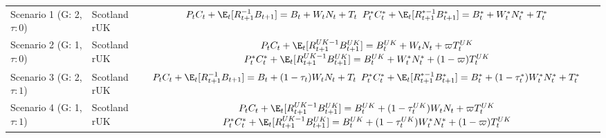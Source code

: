 \begin{table}[H]
    \centering
    \begin{tabular}{l|l|c}
    \makecell{Scenario 1 \\ (G: 2, $\tau: 0$)} & \makecell{Scotland \\ rUK } & 
        \makecell{
            $P_t C_t + \E_t [{R^{-1}_{t+1}}B_{t+1}] = B_t + W_t N_t + T_t$ \\
            $P^*_t C^*_t + \E_t [{R^{*-1}_{t+1}}B^*_{t+1}] = B^*_t + W^*_t N^*_t + T^*_t$
        }  \\ 
    \makecell{Scenario 2 \\ (G: 1, $\tau: 0$)} & \makecell{Scotland \\ rUK } & 
        \makecell{
            $P_t C_t + \E_t [{R^{UK-1}_{t+1}}B^{UK}_{t+1}] = B^{UK}_t + W_t N_t + \varpi T^{UK}_t$ \\
            $P^*_t C^*_t + \E_t [{R^{UK-1}_{t+1}}B^{UK}_{t+1}] = B^{UK}_t + W^*_t N^*_t + (1-\varpi)T^{UK}_t$
        }   \\ 
    \makecell{Scenario 3 \\ (G: 2, $\tau: 1$)} & \makecell{Scotland \\ rUK } & 
    \makecell{
        $P_t C_t + \E_t [{R^{-1}_{t+1}}B_{t+1}] = B_t + (1-\tau_t)W_t N_t + T_t$ \\
        $P^*_t C^*_t + \E_t [{R^{*-1}_{t+1}}B^*_{t+1}] = B^*_t + (1-\tau^*_t)W^*_t N^*_t + T^*_t$ 
    }  \\
    \makecell{Scenario 4 \\ (G: 1, $\tau: 1$)} & \makecell{Scotland \\ rUK } & 
    \makecell{
        $P_t C_t + \E_t [{R^{UK-1}_{t+1}}B^{UK}_{t+1}] = B^{UK}_t + (1-\tau^{UK}_t)W_t N_t + \varpi T^{UK}_t$ \\
        $P^*_t C^*_t + \E_t [{R^{UK-1}_{t+1}}B^{UK}_{t+1}] = B^{UK}_t + (1-\tau^{UK}_t)W^*_t N^*_t + (1-\varpi)T^{UK}_t$
    }  
    \end{tabular}
    \end{table}

